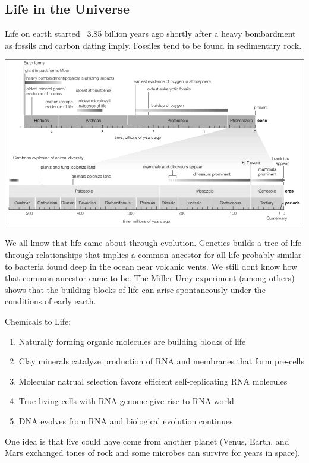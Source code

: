 \documentclass[12pt]{article}
\begin{document}
\subsection{Life in the Universe}
Life on earth started ~3.85 billion years ago shortly after a heavy bombardment as fossils and carbon dating imply. Fossiles tend to be found in sedimentary rock.

\includegraphics[angle=90,scale=0.7]{geologicalTimeline}

We all know that life came about through evolution. Genetics builds a tree of life through relationships that implies a common ancestor for all life probably similar to bacteria found deep in the ocean near volcanic vents. We still dont know how that common ancestor came to be. The Miller-Urey experiment (among others) shows that the building blocks of life can arise spontaneously under the conditions of early earth.

Chemicals to Life:
\begin{enumerate}
    \item Naturally forming organic molecules are building blocks of life
    \item Clay minerals catalyze production of RNA and membranes that form pre-cells
    \item Molecular natrual selection favors efficient self-replicating RNA molecules
    \item True living cells with RNA genome give rise to RNA world
    \item DNA evolves from RNA and biological evolution continues
\end{enumerate}

One idea is that live could have come from another planet (Venus, Earth, and Mars exchanged tones of rock and some microbes can survive for years in space).
\end{document}

